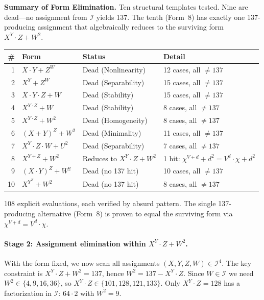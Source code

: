 \documentclass[11pt,a4paper]{article}
\begin{document}
\textbf{Summary of Form Elimination.} Ten structural templates tested.
Nine are dead---no assignment from $\mathcal{I}$ yields 137.
The tenth (Form~8) has exactly one 137-producing assignment that
algebraically reduces to the surviving form $X^Y \cdot Z + W^2$.

\begin{center}
\begin{tabular}{rlll}
\toprule
\textbf{\#} & \textbf{Form} & \textbf{Status} & \textbf{Detail} \\
\midrule
1 & $X \cdot Y + Z^W$     & Dead (Nonlinearity)  & 12 cases, all $\neq 137$ \\
2 & $X^Y + Z^W$           & Dead (Separability)  & 15 cases, all $\neq 137$ \\
3 & $X \cdot Y \cdot Z + W$ & Dead (Stability)   & 15 cases, all $\neq 137$ \\
4 & $X^{Y \cdot Z} + W$   & Dead (Stability)     & 8 cases, all $\neq 137$ \\
5 & $X^{Y \cdot Z} + W^2$ & Dead (Homogeneity)   & 8 cases, all $\neq 137$ \\
6 & $(X+Y)^Z + W^2$       & Dead (Minimality)    & 11 cases, all $\neq 137$ \\
7 & $X^Y \cdot Z \cdot W + U^2$ & Dead (Separability) & 7 cases, all $\neq 137$ \\
8 & $X^{Y+Z} + W^2$       & Reduces to $X^Y \cdot Z + W^2$ & 1 hit: $\chi^{V+d}+d^2 = V^d \cdot \chi + d^2$ \\
9 & $(X \cdot Y)^Z + W^2$  & Dead (no 137 hit)    & 10 cases, all $\neq 137$ \\
10 & $X^{Y^Z} + W^2$       & Dead (no 137 hit)    & 8 cases, all $\neq 137$ \\
\bottomrule
\end{tabular}
\end{center}

108 explicit evaluations, each verified by absurd pattern.
The single 137-producing alternative (Form~8) is proven to equal the
surviving form via $\chi^{V+d} = V^d \cdot \chi$.


\paragraph{Stage 2: Assignment elimination within $X^Y \cdot Z + W^2$.}
With the form fixed, we now scan all assignments $(X,Y,Z,W) \in \mathcal{I}^4$.
The key constraint is $X^Y \cdot Z + W^2 = 137$, hence $W^2 = 137 - X^Y \cdot Z$.
Since $W \in \mathcal{I}$ we need $W^2 \in \{4, 9, 16, 36\}$,
so $X^Y \cdot Z \in \{101, 128, 121, 133\}$. Only $X^Y \cdot Z = 128$
has a factorization in $\mathcal{I}$: $64 \cdot 2$ with $W^2 = 9$.
\end{document}
